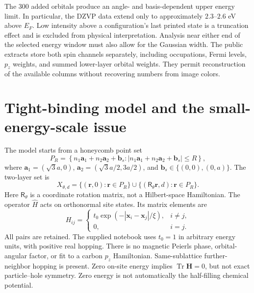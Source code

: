 \documentclass[aps,prl,10pt,onecolumn,superscriptaddress,longbibliography]{revtex4-2}
\newcommand{\Tr}{\operatorname{Tr}}
\begin{document}
\begin{table}[h]
\caption{State-resolved coverage of the original bilayer image series over $30^\circ$--$60^\circ$. An audited alpha column has a converged, normally terminated output and the expected number of PDOS rows. The final column gives the minimum and maximum, over these angles, of the highest printed alpha-spin energy relative to its own $E_F$. The images extend to $+3$ eV, but their numerical state coverage can end earlier.}
\label{tab:coverage}
\begin{ruledtabular}

\end{ruledtabular}
\end{table}

The 300 added orbitals produce an angle- and basis-dependent upper energy limit. In particular, the DZVP data extend only to approximately $2.3$--$2.6$ eV above $E_F$. Low intensity above a configuration's last printed state is a truncation effect and is excluded from physical interpretation. Analysis near either end of the selected energy window must also allow for the Gaussian width. The public extracts store both spin channels separately, including occupations, Fermi levels, $p_z$ weights, and summed lower-layer orbital weights. They permit reconstruction of the available columns without recovering numbers from image colors.

\section{Tight-binding model and the small-energy-scale issue}

The model starts from a honeycomb point set
\begin{equation}
 P_R=\left\{n_1\bm a_1+n_2\bm a_2+\bm b_s:
 |n_1\bm a_1+n_2\bm a_2+\bm b_s|\leq R\right\},
\end{equation}
where $\bm a_1=(\sqrt3a,0)$, $\bm a_2=(\sqrt3a/2,3a/2)$, and $\bm b_s\in\{(0,0),(0,a)\}$. The two-layer set is
\begin{equation}
 X_{\theta,d}=\{(\bm r,0):\bm r\in P_R\}\cup
              \{(\mathsf R_\theta\bm r,d):\bm r\in P_R\}.
\end{equation}
Here $\mathsf R_\theta$ is a coordinate rotation matrix, not a Hilbert-space Hamiltonian. The operator $\hat H$ acts on orthonormal site states. Its matrix elements are
\begin{equation}
 H_{ij}=\begin{cases}
 t_0\exp(-|\bm x_i-\bm x_j|/\xi),&i\ne j,\\
 0,&i=j.
 \end{cases}
 \label{eq:model}
\end{equation}
All pairs are retained. The supplied notebook uses $t_0=1$ in arbitrary energy units, with positive real hopping. There is no magnetic Peierls phase, orbital-angular factor, or fit to a carbon $p_z$ Hamiltonian. Same-sublattice further-neighbor hopping is present. Zero on-site energy implies $\Tr\bm H=0$, but not exact particle--hole symmetry. Zero energy is not automatically the half-filling chemical potential.
\end{document}
